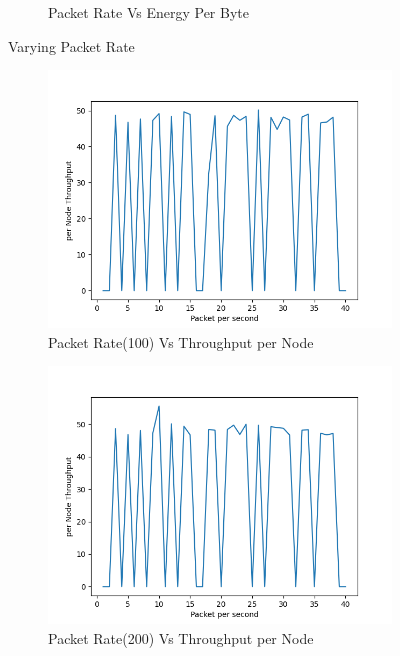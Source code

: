 \begin{figure}[h]
\begin{subfigure}{.5\textwidth}
     \caption{Packet Rate Vs Energy Per Byte}
     \label{packet_rate_energy_mobile_per_byte}
\end{subfigure}
\caption{Varying Packet Rate}
\label{fig:varyingPacketRate}
\end{figure}
\begin{figure}[h]
\begin{subfigure}{.5\textwidth}
  \centering
  \includegraphics[width=.8\linewidth]{_11_2_mobile/Packetpersecond(100)vsperNodeThroughput.png}
     \caption{Packet Rate(100) Vs Throughput per Node}
 \end{subfigure}
\begin{subfigure}{.5\textwidth}
  \centering
  \includegraphics[width=.8\linewidth]{_11_2_mobile/Packetpersecond(200)vsperNodeThroughput.png}
     \caption{Packet Rate(200) Vs Throughput per Node}
    \end{subfigure}
\begin{subfigure}{.5\textwidth}
    \centering

\end{subfigure}
\end{figure}
